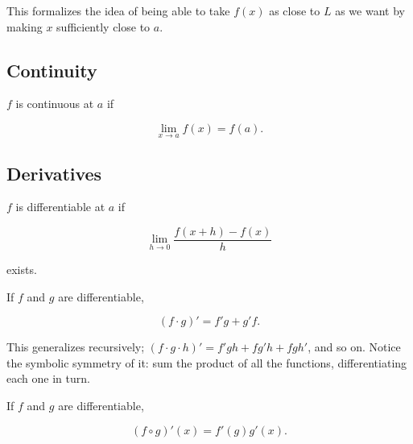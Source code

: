 \documentclass{article}
\begin{document}
This formalizes the idea of being able to take $f(x)$ as close to $L$ as we want
by making $x$ sufficiently close to $a$.

\subsection{Continuity}

\begin{definition}

$f$ is continuous at $a$ if

\begin{equation}
\lim_{x \to a} f(x) = f(a).
\end{equation}

\end{definition}

\subsection{Derivatives}

\begin{definition} 
$f$ is differentiable at $a$ if

\begin{equation}
\lim_{h \to 0} \frac{f(x+h) - f(x)}{h}
\end{equation}

exists.

\end{definition}

\begin{theorem} 

If $f$ and $g$ are differentiable, 

\begin{equation}
(f \cdot g)' = f'g + g'f.
\end{equation}


\end{theorem} 

This generalizes recursively; $(f \cdot g \cdot h)' = f'gh + fg'h + fgh'$, and
so on. Notice the symbolic symmetry of it: sum the product of all the functions,
differentiating each one in turn.

\begin{theorem}

If $f$ and $g$ are differentiable,

\begin{equation}
(f \circ g)'(x) = f'(g)g'(x).
\end{equation}


\end{theorem}
\end{document}
